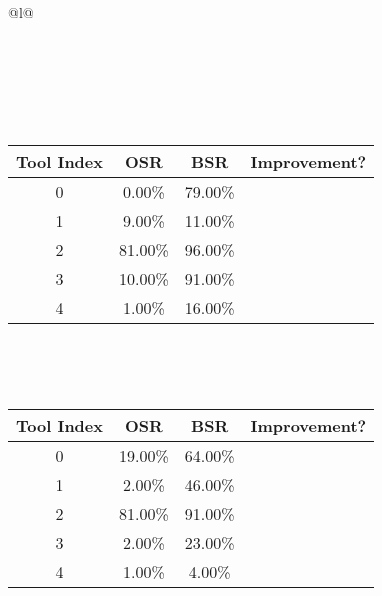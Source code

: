 \begin{longtable}{@{}l@{}}
\caption{Tool selection results for llama3.2:3b on ollama with attacker llama3.2:3b and defense objective. \\ \textbf{Overall Improvement: 82.00\%}} \\
\toprule
{} \\
\midrule
\endfirsthead
\toprule
{} \\
\midrule
\endhead
\bottomrule
\endfoot
\begin{minipage}{\textwidth}
\centering{}\\[0.8ex]
\begin{tabular}{|c|c|c|c|} \hline
\textbf{Tool Index} & \textbf{OSR} & \textbf{ BSR} & \textbf{Improvement?} \\ \hline
0 & 0.00\% & 79.00\% & \textcolor{green}{\ding{51}} \\ \hline
1 & 9.00\% & 11.00\% & \textcolor{green}{\ding{51}} \\ \hline
2 & 81.00\% & 96.00\% & \textcolor{green}{\ding{51}} \\ \hline
3 & 10.00\% & 91.00\% & \textcolor{green}{\ding{51}} \\ \hline
4 & 1.00\% & 16.00\% & \textcolor{green}{\ding{51}} \\ \hline
\end{tabular}
\end{minipage}\\[2ex]
\begin{minipage}{\textwidth}
\centering\vspace{2ex}
\\[0.8ex]
\begin{tabular}{|c|c|c|c|} \hline
\textbf{Tool Index} & \textbf{OSR} & \textbf{ BSR} & \textbf{Improvement?} \\ \hline
0 & 19.00\% & 64.00\% & \textcolor{green}{\ding{51}} \\ \hline
1 & 2.00\% & 46.00\% & \textcolor{green}{\ding{51}} \\ \hline
2 & 81.00\% & 91.00\% & \textcolor{green}{\ding{51}} \\ \hline
3 & 2.00\% & 23.00\% & \textcolor{green}{\ding{51}} \\ \hline
4 & 1.00\% & 4.00\% & \textcolor{green}{\ding{51}} \\ \hline

\end{tabular}
\end{minipage}
\end{longtable}
